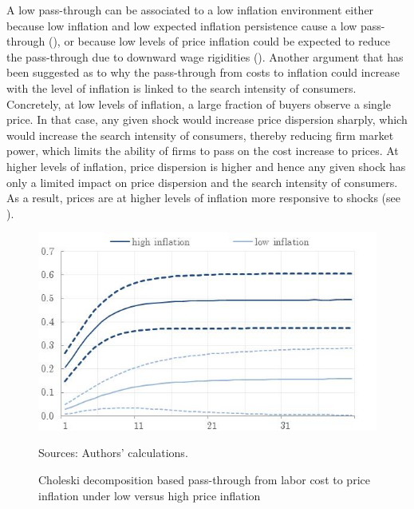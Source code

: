 \documentclass[11pt]{article}
\begin{document}
A low pass-through can be associated to a low inflation environment either because low inflation and low expected inflation persistence cause a low pass-through (\cite{Taylor00}), or because low levels of price inflation could be expected to reduce the pass-through due to downward wage rigidities (\cite{Daly_Hobijn_2014}). 
Another argument that has been suggested as to why the pass-through from costs to inflation could increase with the level of inflation is linked to the search intensity of consumers. Concretely, at low levels of inflation, a large fraction of buyers observe a single price. In that case, any given shock would increase price dispersion sharply, which would increase the search intensity of consumers, thereby reducing firm market power, which limits the ability of firms to pass on the cost increase to prices. At higher levels of inflation, price dispersion is higher and hence any given shock has only a limited impact on price dispersion and the search intensity of consumers. As a result, prices are at higher levels of inflation more responsive to shocks (see \cite{Head_10}). 

\begin{figure}[!htbp]
\begin{center}
\caption{Choleski decomposition based pass-through from labor cost to price inflation under low versus high price inflation}\label{fig:Choleski_highlow}
\includegraphics[scale = .85]{Results_US_CholskiIRF_highlowinfl.jpg}
\begin{minipage}{0.64\textwidth} {\footnotesize
Sources: Authors' calculations.\par}
\end{minipage}
\end{center}
\end{figure}
\end{document}
